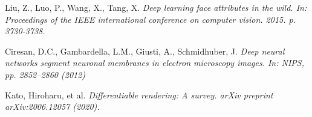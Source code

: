 \documentclass[12pt,a4]{article}
\begin{document}
\begin{thebibliography}{9}
    Liu, Z., Luo, P., Wang, X., Tang, X.
    \textit{Deep learning face attributes in the wild. In: Proceedings of the IEEE international conference on computer vision. 2015. p. 3730-3738.}

    Ciresan, D.C., Gambardella, L.M., Giusti, A., Schmidhuber, J.
    \textit{Deep neural networks segment neuronal membranes in electron microscopy images. In: NIPS, pp. 2852–2860 (2012)}

    Kato, Hiroharu, et al.
    \textit{Differentiable rendering: A survey. arXiv preprint arXiv:2006.12057 (2020).}

	\end{thebibliography}
\end{document}
